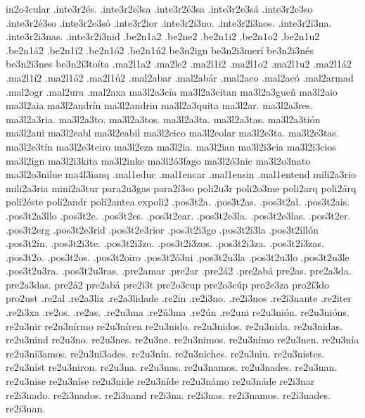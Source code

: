 {in2o4cular
%
%
.inte3r2és. .inte3r2e3sa .inte3r2é3sa .inte3r2e3sá .inte3r2e3so .inte3r2é3so .inte3r2e3só .inte3r2ior .inte3r2i3no. .inte3r2i3nos. .inte3r2i3na. .inte3r2i3nas. .inte3r2i3nid
%
.be2n1a2 .be2ne2 .be2n1i2 .be2n1o2 .be2n1u2 .be2n1á2        .be2n1í2 .be2n1ó2 .be2n1ú2
%
be3n2ign
be3n2i3merí
be3n2i3nés
be3n2i3nes
be3n2i3toíta
%
.ma2l1a2 .ma2le2 .ma2l1i2 .ma2l1o2 .ma2l1u2 .ma2l1á2        .ma2l1í2 .ma2l1ó2 .ma2l1ú2
%
.mal2abar
.mal2abár
.mal2aco
.mal2acó
.mal2armad
.mal2ogr
.mal2ura
.mal2axa
%
ma3l2a3cía
ma3l2a3citan
ma3l2a3gueñ
ma3l2aio
ma3l2aia
ma3l2andrín
ma3l2andrin
ma3l2a3quita
ma3l2ar.
ma3l2a3res.
ma3l2a3ria.
ma3l2a3to.
ma3l2a3tos.
ma3l2a3ta.
ma3l2a3tas.
ma3l2a3tión
ma3l2aui
ma3l2eabl
ma3l2eabil
ma3l2eico
ma3l2eolar
ma3l2e3ta.
ma3l2e3tas.
ma3l2e3tín
ma3l2e3teiro
ma3l2eza
ma3l2ia.
ma3l2ian
ma3l2i3cia
ma3l2i3cios
ma3l2ign
ma3l2i3kita
ma3l2inke
ma3l2ó3fago
ma3l2ó3nic
ma3l2o3nato
ma3l2o3nilue
ma4l3ianq
%
.mal1educ
.mal1encar
.mal1ensin
.mal1entend
%
%
mili2a3rio mili2a3ria
mini2a3tur
%
para2u3gas para2í3so
%
%
poli2u3r
poli2o3me
poli2arq
poli2árq
poli2éste
poli2andr
poli2antea
expoli2
%
.pos3t2a.
.pos3t2as.
.pos3t2al.
.pos3t2ais.
.pos3t2a3llo
.pos3t2e.
.pos3t2es.
.pos3t2ear.
.pos3t2e3la.
.pos3t2e3las.
.pos3t2er.
.pos3t2erg
.pos3t2e3rid
.pos3t2e3rior
.pos3t2i3go
.pos3t2i3la
.pos3t2illón
.pos3t2ín.
.pos3t2i3te.
.pos3t2i3zo.
.pos3t2i3zos.
.pos3t2i3za.
.pos3t2i3zas.
.pos3t2o.
.pos3t2os.
.pos3t2oiro
.pos3t2ó3ni
.pos3t2u3la
.pos3t2u3lo
.pos3t2u3le
.pos3t2u3ra.
.pos3t2u3ras.
%
%
.pre2amar
.pre2ar
.pre2á2
.pre2abá
%
pre2as.
pre2a3da.
pre2a3das.
pre2á2
pre2abá
pre2i3t
pre2o3cup
pre2o3cúp
%
%
pro2e3za
pro2í3do
pro2ust
%
%
.re2al .re2a3liz .re2a3lidade .re2in .re2i3no. .re2i3nos .re2i3nante .re2iter
.re2i3xa .re2os. .re2as. .re2u3ma .re2ú3ma .re2ún .re2uni
%
re2u3nión. re2u3nións. re2u3nir re2u3nírmo re2u3níren
re2u3nido. re2u3nidos. re2u3nida. re2u3nidas. re2u3nind
re2u3no. re2u3nes. re2u3ne. re2u3nimos. re2u3nímo re2u3nen.
re2u3nía re2u3ni3amos. re2u3ni3ades.
re2u3nín. re2u3niches. re2u3niu. re2u3nistes. re2u3níst re2u3niron.
re2u3na. re2u3nas. re2u3namos. re2u3nades. re2u3nan.
re2u3nise re2u3níse
re2u3nide re2u3níde re2u3námo re2u3náde
%
re2i3nar re2i3nado. re2i3nados. re2i3nand
re2i3na. re2i3nas. re2i3namos. re2i3nades. re2i3nan.
}
